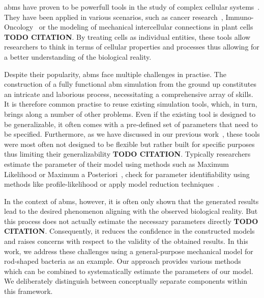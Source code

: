\documentclass{article}
\begin{document}
\acp{abm} have proven to be powerfull tools in the study of complex cellular
systems~\cite{Pleyer2023}.
They have been applied in various scenarios, such as cancer
research~\cite{Ghaffarizadeh2018,Cooper2020}, Immuno-Oncology~\cite{Karolak2021} or the modeling
of mechanical intercellular connections in plant cells \textbf{TODO CITATION}.
By treating cells as individual entities, these tools allow researchers to think in terms of
cellular properties and processes thus allowing for a better understanding of the biological
reality.

Despite their popularity, \acp{abm} face multiple challenges in practise.
The construction of a fully functional \ac{abm} simulation from the ground up constitutes an
intricate and laborious process, necessitating a comprehensive array of skills. It is therefore
common practise to reuse existing simulation tools, which, in turn, brings along a number of
other problems.
Even if the existing tool is designed to be generalizable, it often comes with a pre-defined set
of parameters that need to be specified.
Furthermore, as we have discussed in our previous work~\cite{Pleyer2023}, these tools were most
often not designed to be flexible but rather built for specific purposes thus limiting their
generalizability \textbf{TODO CITATION}.
Typically researchers estimate the parameter of their model using methods such as Maximum Likelihood
or Maximum a Posteriori~\cite{Gbor2015,Banga2008,Ashyraliyev2009}, check for parameter
identifiability using methods like profile-likelihood or apply model reduction
techniques~\cite{Kreutz2013,Raue2014,Simpson2025}.

In the context of \acp{abm}, however, it is often only shown that the generated results lead to the
desired phenomenon aligning with the observed biological reality.
But this process does not actually estimate the necessary parameters directly \textbf{TODO CITATION}.
Consequently, it reduces the confidence in the constructed models and raises concerns with respect
to the validity of the obtained results.
In this work, we address these challenges using a general-purpose mechanical model for rod-shaped
bacteria as an example.
Our approach provides various methods which can be combined to systematically estimate the
parameters of our model. We deliberately distinguish between conceptually separate components within
this framework.
\end{document}

